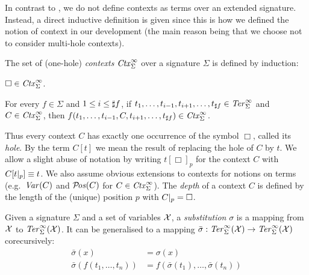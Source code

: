 In contrast to \cite{terese-03}, we do not define contexts as terms over an
extended signature. Instead, a direct inductive definition is given since this
is how we defined the notion of context in our \Coq development (the main
reason being that we choose not to consider multi-hole contexts).

\begin{definition}%
The set of (one-hole) \emph{contexts} $\mathit{Ctx}_\Sigma^\infty$ over a signature
$\Sigma$ is defined by induction:
\begin{compactenum}
  \item
    $\Box \in \mathit{Ctx}_\Sigma^\infty$.
  \item
    For every $f \in \Sigma$ and $1 \le i \le \sharp f$, if $t_1,
    \ldots, t_{i - 1}, t_{i + 1}, \ldots, t_{\sharp f} \in \mathit{Ter}_\Sigma^\infty$ and
    $C \in \mathit{Ctx}_\Sigma^\infty$, then $f(t_1, \ldots, t_{i - 1}, C, t_{i + 1},
    \ldots, t_{\sharp f}) \in \mathit{Ctx}_\Sigma^\infty$.
\end{compactenum}
\end{definition}

Thus every context $C$ has exactly one occurrence of the symbol $\Box$, called
its \emph{hole}. By the term $C[t]$ we mean the result of replacing the hole
of $C$ by $t$. We allow a slight abuse of notation by writing
$t[\Box]_p$ for the context $C$ with $C[t |_{p}] \equiv t$. We
also assume obvious extensions to contexts for notions on terms
(e.g.\ $\mathit{Var}(C)$ and $\mathcal{P}\!\mathit{os}(C)$ for $C \in \mathit{Ctx}_\Sigma^\infty$).
The \emph{depth} of a context $C$ is defined by the length of the
(unique) position $p$ with $C |_{p} = \Box$.


\begin{definition}%
Given a signature $\Sigma$ and a set of variables $\mathcal{X}$, a
\emph{substitution} $\sigma$ is a mapping from $\mathcal{X}$ to $\mathit{Ter}_\Sigma^\infty(\mathcal{X})$. It
can be generalised to a mapping $\bar{\sigma} : \mathit{Ter}_\Sigma^\infty(\mathcal{X}) \rightarrow
\mathit{Ter}_\Sigma^\infty(\mathcal{X})$ corecursively:
\begin{align*}
  \bar{\sigma}(x) &= \sigma(x)\\
  \bar{\sigma}(f(t_1, \ldots, t_n)) &= f(\bar{\sigma}(t_1), \ldots,
  \bar{\sigma}(t_n))
\end{align*}
\end{definition}

